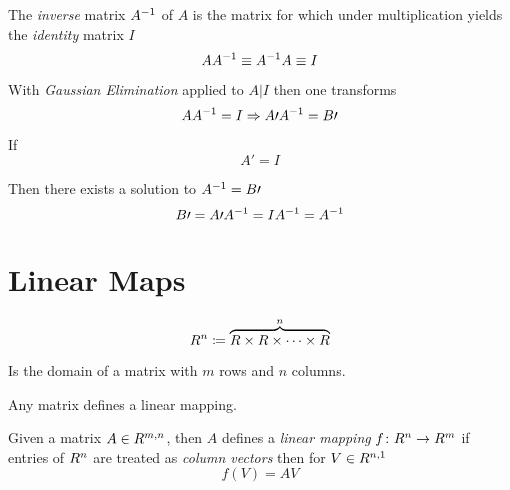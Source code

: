 \begin{definition}
    The \textit{inverse} matrix ${A}^{-1}$ of $A$ is the matrix for which under multiplication yields the \textit{identity} matrix $I$
    \begin{equation}
        A {A}^{-1} \equiv {A}^{-1} A \equiv I
    \end{equation}
    
    With \textit{Gaussian Elimination} applied to $A \vert I$ then one transforms
    \begin{equation}
        A {A}^{-1} = I \Rightarrow A\prime {A}^{-1} = B\prime
    \end{equation}
    
    If
    \begin{equation}
        A\prime = I
    \end{equation}
    
    Then there exists a solution to ${A}^{-1} = B\prime$
    \begin{equation}
        B\prime = A\prime {A}^{-1} = I {A}^{-1} = {A}^{-1}
    \end{equation}
\end{definition}

\section{Linear Maps}

\begin{definition}[$\Real^{n}$]
    \begin{equation}
        \relax{R}^{n} \coloneqq \overbrace{\relax{R} \times \relax{R} \times \cdots \times \relax{R}}^{n}
    \end{equation}
\end{definition}

\begin{definition}[$\Real^{m, n}$]
    Is the domain of a matrix with $m$ rows and $n$ columns.
\end{definition}

\begin{lemma}
    Any matrix defines a linear mapping.
    
    Given a matrix $A \in \relax{R}^{m, n}$, then $A$ defines a \textit{linear mapping} $f \colon \relax{R}^{n} \to \relax{R}^{m}$ if entries of $\Real^{n}$ are treated as \textit{column vectors} then for $V \in \relax{R}^{n, 1}$
    \begin{equation}
        f(V) = A V
    \end{equation}
\end{lemma}

